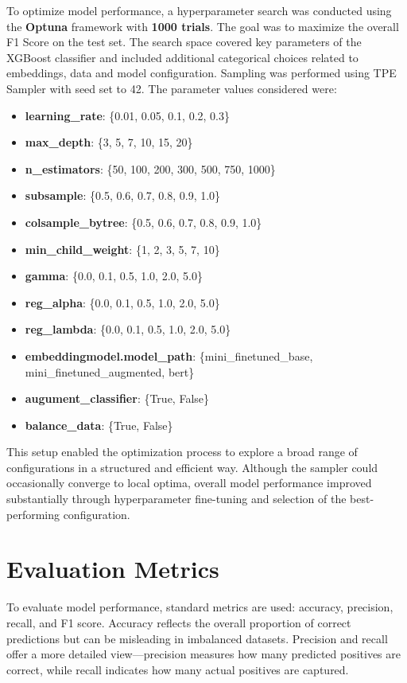 \documentclass{SGGW-thesis-EN}
\begin{document}
To optimize model performance, a hyperparameter search was conducted using the \textbf{Optuna} framework with \textbf{1000 trials}. 
The goal was to maximize the overall F1 Score on the test set. The search space covered key parameters of the XGBoost classifier and 
included additional categorical choices related to embeddings, data and model configuration. 
Sampling was performed using TPE Sampler with seed set to 42.
The parameter values considered were:
\begin{itemize}
    \item \textbf{learning\_rate}: \{0.01, 0.05, 0.1, 0.2, 0.3\}
    \item \textbf{max\_depth}: \{3, 5, 7, 10, 15, 20\}
    \item \textbf{n\_estimators}: \{50, 100, 200, 300, 500, 750, 1000\}
    \item \textbf{subsample}: \{0.5, 0.6, 0.7, 0.8, 0.9, 1.0\}
    \item \textbf{colsample\_bytree}: \{0.5, 0.6, 0.7, 0.8, 0.9, 1.0\}
    \item \textbf{min\_child\_weight}: \{1, 2, 3, 5, 7, 10\}
    \item \textbf{gamma}: \{0.0, 0.1, 0.5, 1.0, 2.0, 5.0\}
    \item \textbf{reg\_alpha}: \{0.0, 0.1, 0.5, 1.0, 2.0, 5.0\}
    \item \textbf{reg\_lambda}: \{0.0, 0.1, 0.5, 1.0, 2.0, 5.0\}
    \item \textbf{embeddingmodel.model\_path}: \{mini\_finetuned\_base, mini\_finetuned\_augmented, bert\}
    \item \textbf{augument\_classifier}: \{True, False\}
    \item \textbf{balance\_data}: \{True, False\}
\end{itemize}

This setup enabled the optimization process to explore a broad range of configurations in a structured and efficient way. 
Although the sampler could occasionally converge to local optima, 
overall model performance improved substantially through hyperparameter fine-tuning and selection of the best-performing configuration.

\section{Evaluation Metrics}

To evaluate model performance, standard metrics are used: accuracy, precision, recall, and F1 score. Accuracy reflects the overall proportion  
of correct predictions but can be misleading in imbalanced datasets. Precision and recall offer a more detailed view—precision measures how  
many predicted positives are correct, while recall indicates how many actual positives are captured.
\end{document}
